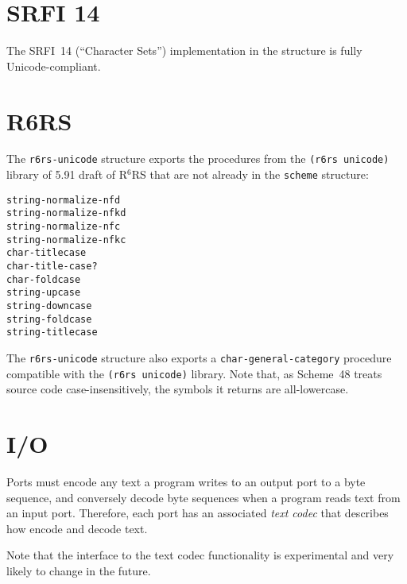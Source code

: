 \section{SRFI 14}

The SRFI~14 (``Character Sets'') implementation in the 
structure is fully Unicode-compliant.

\section{R6RS}

The \texttt{r6rs-unicode} structure exports the procedures from the
\texttt{(r6rs unicode)} library of 5.91 draft of R$^6$RS that are not
already in the \texttt{scheme} structure:

\begin{flushleft}
\texttt{string-normalize-nfd}\\
\texttt{string-normalize-nfkd}\\
\texttt{string-normalize-nfc}\\
\texttt{string-normalize-nfkc}\\
\texttt{char-titlecase}\\
\texttt{char-title-case?}\\
\texttt{char-foldcase}\\
\texttt{string-upcase}\\
\texttt{string-downcase}\\
\texttt{string-foldcase}\\
\texttt{string-titlecase}
\end{flushleft}
%
The \texttt{r6rs-unicode} structure also exports a
\texttt{char-general-category} procedure compatible with the
\texttt{(r6rs unicode)} library.  Note that, as Scheme~48 treats
source code case-insensitively, the symbols it returns are
all-lowercase.

\section{I/O}

Ports must encode any text a program writes to an output port to a
byte sequence, and conversely decode byte sequences when a program
reads text from an input port.  Therefore, each port has an associated
\textit{text codec} that describes how encode and decode text.

Note that the interface to the text codec functionality is
experimental and very likely to change in the future.

